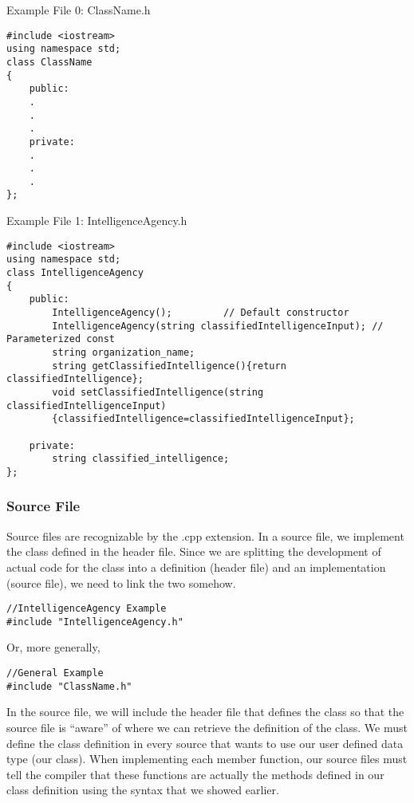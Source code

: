 \begin{example}
    Example File 0: ClassName.h
    \begin{verbatim}
#include <iostream> 
using namespace std; 
class ClassName 
{ 
    public: 
    . 
    . 
    . 
    private: 
    . 
    . 
    . 
};

    \end{verbatim}
\end{example}

\begin{example}
    Example File 1: IntelligenceAgency.h
    \begin{verbatim}
#include <iostream> 
using namespace std; 
class IntelligenceAgency
{
    public:
        IntelligenceAgency();         // Default constructor
        IntelligenceAgency(string classifiedIntelligenceInput); // Parameterized const
        string organization_name;
        string getClassifiedIntelligence(){return classifiedIntelligence};
        void setClassifiedIntelligence(string classifiedIntelligenceInput)
        {classifiedIntelligence=classifiedIntelligenceInput};

    private:
        string classified_intelligence;
};
    \end{verbatim}
\end{example}

\subsubsection{Source File}

Source files are recognizable by the .cpp extension. In a source file, we implement the class defined in the header file. Since we are splitting the development of actual code for the class into a definition (header file) and an implementation (source file), we need to link the two somehow.

\begin{verbatim}
//IntelligenceAgency Example
#include "IntelligenceAgency.h"
\end{verbatim}

Or, more generally,

\begin{verbatim}
//General Example
#include "ClassName.h"
\end{verbatim}

In the source file, we will include the header file that defines the class so that the source file is “aware” of where we can retrieve the definition of the class. We must define the class definition in every source that wants to use our user defined data type (our class). When implementing each member function, our source files must tell the compiler that these functions are actually the methods defined in our class definition using the syntax that we showed earlier.

